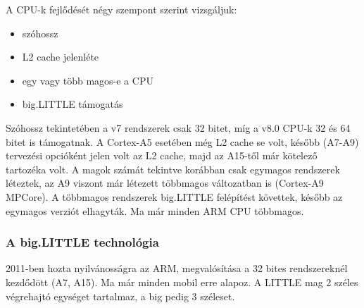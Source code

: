 A CPU-k fejlődését négy szempont szerint vizsgáljuk:
\begin{itemize}
    \item szóhossz
    \item L2 cache jelenléte
    \item egy vagy több magos-e a CPU
    \item big.LITTLE támogatás
\end{itemize}

Szóhossz tekintetében a v7 rendszerek csak 32 bitet, míg a v8.0 CPU-k 32 és 64 bitet is támogatnak.
A Cortex-A5 esetében még L2 cache se volt, később (A7-A9) tervezési opcióként jelen volt az L2 cache, majd az A15-től már kötelező tartozéka volt.
A magok számát tekintve korábban csak egymagos rendszerek léteztek, az A9 viszont már létezett többmagos változatban is (Cortex-A9 MPCore).
A többmagos rendszerek big.LITTLE felépítést követtek, később az egymagos verziót elhagyták.
Ma már minden ARM CPU többmagos.

\subsubsection{A big.LITTLE technológia}
2011-ben hozta nyilvánosságra az ARM, megvalósítása a 32 bites rendszereknél kezdődött (A7, A15).
Ma már minden mobil erre alapoz.
A LITTLE mag 2 széles végrehajtó egységet tartalmaz, a big pedig 3 széleset.